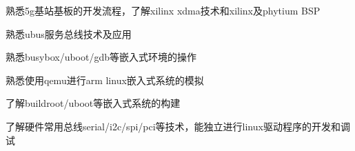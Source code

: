   \item 熟悉5g基站基板的开发流程，了解xilinx xdma技术和xilinx及phytium BSP
  \item 熟悉ubus服务总线技术及应用
  \item 熟悉busybox/uboot/gdb等嵌入式环境的操作
  \item 熟悉使用qemu进行arm linux嵌入式系统的模拟
  \item 了解buildroot/uboot等嵌入式系统的构建
  \item 了解硬件常用总线serial/i2c/spi/pci等技术，能独立进行linux驱动程序的开发和调试
